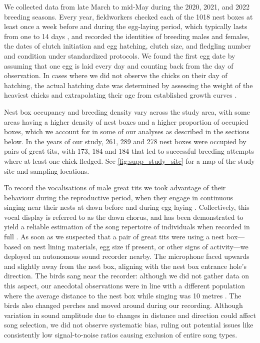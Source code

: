 \documentclass[9pt, onecolumn, twoside, lineno]{gsajnl}
\begin{document}
We collected data from late March to mid-May during the 2020, 2021, and 2022 breeding seasons. Every year, fieldworkers checked each of the 1018 nest boxes at least once a week before and during the egg-laying period, which typically lasts from one to 14 days \autocite{Perrins1965}, and recorded the identities of breeding males and females, the dates of clutch initiation and egg hatching, clutch size, and fledgling number and condition under standardized protocols. We found the first egg date by assuming that one egg is laid every day and counting back from the day of observation. In cases where we did not observe the chicks on their day of hatching, the actual hatching date was determined by assessing the weight of the heaviest chicks and extrapolating their age from established growth curves \autocite{cresswell2003, gibb1950}.

Nest box occupancy and breeding density vary across the study area, with some areas having a higher density of nest boxes and a higher proportion of occupied boxes, which we account for in some of our analyses as described in the sections below. In the years of our study,  261, 289 and 278 nest boxes were occupied by pairs of great tits, with 173, 184 and 184 that led to successful breeding attempts where at least one chick fledged. See \autoref{fig:supp_study_site} for a map of the study site and sampling locations.

To record the vocalisations of male great tits we took advantage of their behaviour during the reproductive period, when they engage in continuous singing near their nests at dawn before and during egg laying \autocite{mace1987}. Collectively, this vocal display is referred to as the dawn chorus, and has been demonstrated to yield a reliable estimation of the song repertoire of individuals when recorded in full \autocite{rivera-gutierrez2012, vanduyse2005}. As soon as we suspected that a pair of great tits were using a nest box---based on nest lining materials, egg size if present, or other signs of activity---we deployed an autonomous sound recorder nearby. The microphone faced upwards and slightly away from the nest box, aligning with the nest box entrance hole's direction. The birds sang near the recorder: although we did not gather data on this aspect, our anecdotal observations were in line with a different population where the average distance to the nest box while singing was 10 metres \autocite{halfwerk2012}. The birds also changed perches and moved around during our recording. Although variation in sound amplitude due to changes in distance and direction could affect song selection, we did not observe systematic bias, ruling out potential issues like consistently low signal-to-noise ratios causing exclusion of entire song types.
\end{document}
